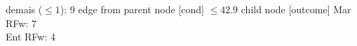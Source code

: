 {{{%
demais ($\leq 1$): 9} edge from parent node [cond] {$\leq42.9$}}
child {node [outcome] {
Mar RFw: 7\\
Ent RFw: 4\\
}}}
